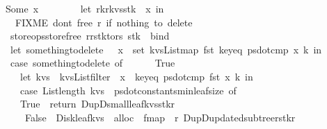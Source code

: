 \begin{isabellebody}
\ \ \ \ {\isacharbar}\ Some\ x\ {\isasymRightarrow}\ {\isacharparenleft}\isanewline
\ \ \ \ \ \ let\ {\isacharparenleft}r{}{\isacharcomma}k{\isacharcomma}r{\isacharcomma}kvs{\isacharcomma}stk{\isacharparenright}\ {\isacharequal}\ x\ in\isanewline
\ \ \ \ \ \ {\isacharparenleft}{\isacharasterisk}\ FIXME\ don{\isacharprime}t\ free\ r{}\ if\ nothing\ to\ delete\ {\isacharasterisk}{\isacharparenright}\isanewline
\ \ \ \ \ \ {\isacharparenleft}store{\isacharunderscore}ops{\isacharbar}{\isachargreater}store{\isacharunderscore}free{\isacharparenright}\ {\isacharparenleft}r{}{\isacharhash}{\isacharparenleft}r{\isacharunderscore}stk{\isacharunderscore}to{\isacharunderscore}rs\ stk{\isacharparenright}{\isacharparenright}\ {\isacharbar}{\isachargreater}\ bind\ {\isacharparenleft}{\isacharpercent}\ {\isacharunderscore}{\isachardot}\isanewline
\ \ \ \ \ \ let\ something{\isacharunderscore}to{\isacharunderscore}delete\ {\isacharequal}\ {\isacharparenleft}{\isacharquery}\ x\ {\isacharcolon}\ set\ {\isacharparenleft}kvs{\isacharbar}{\isachargreater}List{\isachardot}map\ fst{\isacharparenright}{\isachardot}\ key{\isacharunderscore}eq\ {\isacharparenleft}ps{}{\isacharbar}{\isachargreater}dot{\isacharunderscore}cmp{\isacharparenright}\ x\ k{\isacharparenright}\ in\isanewline
\ \ \ \ \ \ case\ something{\isacharunderscore}to{\isacharunderscore}delete\ of\isanewline
\ \ \ \ \ \ True\ {\isasymRightarrow}\ {\isacharparenleft}\isanewline
\ \ \ \ \ \ \ \ let\ kvs{\isacharprime}\ {\isacharequal}\ kvs{\isacharbar}{\isachargreater}List{\isachardot}filter\ {\isacharparenleft}{\isacharpercent}\ x{\isachardot}\ {\isachartilde}\ {\isacharparenleft}key{\isacharunderscore}eq\ {\isacharparenleft}ps{}{\isacharbar}{\isachargreater}dot{\isacharunderscore}cmp{\isacharparenright}\ {\isacharparenleft}fst\ x{\isacharparenright}\ k{\isacharparenright}{\isacharparenright}\ in\isanewline
\ \ \ \ \ \ \ \ case\ {\isacharparenleft}List{\isachardot}length\ kvs{\isacharprime}\ {\isacharless}\ ps{}{\isacharbar}{\isachargreater}dot{\isacharunderscore}constants{\isacharbar}{\isachargreater}min{\isacharunderscore}leaf{\isacharunderscore}size{\isacharparenright}\ of\isanewline
\ \ \ \ \ \ \ \ True\ {\isasymRightarrow}\ {\isacharparenleft}return\ {\isacharparenleft}D{\isacharunderscore}up{\isacharparenleft}D{\isacharunderscore}small{\isacharunderscore}leaf{\isacharparenleft}kvs{\isacharprime}{\isacharparenright}{\isacharcomma}stk{\isacharcomma}r{}{\isacharparenright}{\isacharparenright}{\isacharparenright}\isanewline
\ \ \ \ \ \ \ \ {\isacharbar}\ False\ {\isasymRightarrow}\ {\isacharparenleft}Disk{\isacharunderscore}leaf{\isacharparenleft}kvs{\isacharprime}{\isacharparenright}\ {\isacharbar}{\isachargreater}\ alloc\ {\isacharbar}{\isachargreater}\ fmap\ {\isacharparenleft}{\isacharpercent}\ r{\isachardot}\ D{\isacharunderscore}up{\isacharparenleft}D{\isacharunderscore}updated{\isacharunderscore}subtree{\isacharparenleft}r{\isacharparenright}{\isacharcomma}stk{\isacharcomma}r{}{\isacharparenright}{\isacharparenright}{\isacharparenright}{\isacharparenright}\isanewline

\end{isabellebody}
